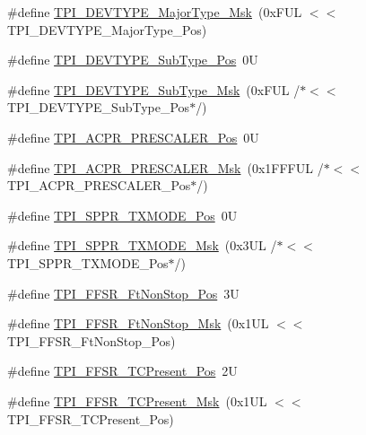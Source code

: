 \begin{DoxyCompactItemize}
\item 
\#define \hyperlink{group___c_m_s_i_s___t_p_i_gaecbceed6d08ec586403b37ad47b38c88}{T\-P\-I\-\_\-\-D\-E\-V\-T\-Y\-P\-E\-\_\-\-Major\-Type\-\_\-\-Msk}~(0x\-F\-U\-L $<$$<$ T\-P\-I\-\_\-\-D\-E\-V\-T\-Y\-P\-E\-\_\-\-Major\-Type\-\_\-\-Pos)
\item 
\#define \hyperlink{group___c_m_s_i_s___t_p_i_ga0c799ff892af5eb3162d152abc00af7a}{T\-P\-I\-\_\-\-D\-E\-V\-T\-Y\-P\-E\-\_\-\-Sub\-Type\-\_\-\-Pos}~0\-U
\item 
\#define \hyperlink{group___c_m_s_i_s___t_p_i_ga5b2fd7dddaf5f64855d9c0696acd65c1}{T\-P\-I\-\_\-\-D\-E\-V\-T\-Y\-P\-E\-\_\-\-Sub\-Type\-\_\-\-Msk}~(0x\-F\-U\-L /$\ast$$<$$<$ T\-P\-I\-\_\-\-D\-E\-V\-T\-Y\-P\-E\-\_\-\-Sub\-Type\-\_\-\-Pos$\ast$/)
\item 
\#define \hyperlink{group___c_m_s_i_s___t_p_i_ga5a82d274eb2df8b0c92dd4ed63535928}{T\-P\-I\-\_\-\-A\-C\-P\-R\-\_\-\-P\-R\-E\-S\-C\-A\-L\-E\-R\-\_\-\-Pos}~0\-U
\item 
\#define \hyperlink{group___c_m_s_i_s___t_p_i_ga4fcacd27208419929921aec8457a8c13}{T\-P\-I\-\_\-\-A\-C\-P\-R\-\_\-\-P\-R\-E\-S\-C\-A\-L\-E\-R\-\_\-\-Msk}~(0x1\-F\-F\-F\-U\-L /$\ast$$<$$<$ T\-P\-I\-\_\-\-A\-C\-P\-R\-\_\-\-P\-R\-E\-S\-C\-A\-L\-E\-R\-\_\-\-Pos$\ast$/)
\item 
\#define \hyperlink{group___c_m_s_i_s___t_p_i_ga0f302797b94bb2da24052082ab630858}{T\-P\-I\-\_\-\-S\-P\-P\-R\-\_\-\-T\-X\-M\-O\-D\-E\-\_\-\-Pos}~0\-U
\item 
\#define \hyperlink{group___c_m_s_i_s___t_p_i_gaca085c8a954393d70dbd7240bb02cc1f}{T\-P\-I\-\_\-\-S\-P\-P\-R\-\_\-\-T\-X\-M\-O\-D\-E\-\_\-\-Msk}~(0x3\-U\-L /$\ast$$<$$<$ T\-P\-I\-\_\-\-S\-P\-P\-R\-\_\-\-T\-X\-M\-O\-D\-E\-\_\-\-Pos$\ast$/)
\item 
\#define \hyperlink{group___c_m_s_i_s___t_p_i_ga9537b8a660cc8803f57cbbee320b2fc8}{T\-P\-I\-\_\-\-F\-F\-S\-R\-\_\-\-Ft\-Non\-Stop\-\_\-\-Pos}~3\-U
\item 
\#define \hyperlink{group___c_m_s_i_s___t_p_i_gaaa313f980974a8cfc7dac68c4d805ab1}{T\-P\-I\-\_\-\-F\-F\-S\-R\-\_\-\-Ft\-Non\-Stop\-\_\-\-Msk}~(0x1\-U\-L $<$$<$ T\-P\-I\-\_\-\-F\-F\-S\-R\-\_\-\-Ft\-Non\-Stop\-\_\-\-Pos)
\item 
\#define \hyperlink{group___c_m_s_i_s___t_p_i_gad30fde0c058da2ffb2b0a213be7a1b5c}{T\-P\-I\-\_\-\-F\-F\-S\-R\-\_\-\-T\-C\-Present\-\_\-\-Pos}~2\-U
\item 
\#define \hyperlink{group___c_m_s_i_s___t_p_i_ga0d6bfd263ff2fdec72d6ec9415fb1135}{T\-P\-I\-\_\-\-F\-F\-S\-R\-\_\-\-T\-C\-Present\-\_\-\-Msk}~(0x1\-U\-L $<$$<$ T\-P\-I\-\_\-\-F\-F\-S\-R\-\_\-\-T\-C\-Present\-\_\-\-Pos)
$$
\end{DoxyCompactItemize}

